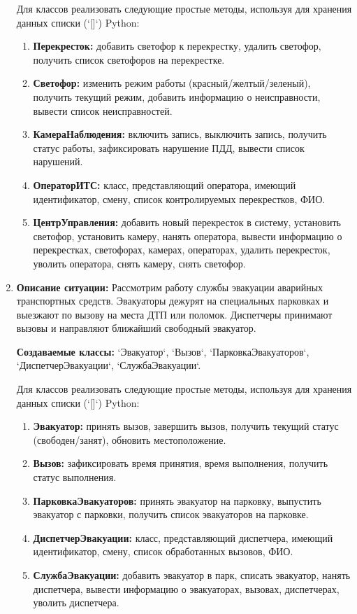 \begin{enumerate}
Для классов реализовать следующие простые методы, используя для хранения данных списки (`[]`) Python:
\begin{enumerate}
    \item \textbf{Перекресток:} добавить светофор к перекрестку, удалить светофор, 
    получить список светофоров на перекрестке.
    \item \textbf{Светофор:} изменить режим работы (красный/желтый/зеленый), 
    получить текущий режим, добавить информацию о неисправности, вывести список неисправностей.
    \item \textbf{КамераНаблюдения:} включить запись, выключить запись, 
    получить статус работы, зафиксировать нарушение ПДД, вывести список нарушений.
    \item \textbf{ОператорИТС:} класс, представляющий оператора, 
    имеющий идентификатор, смену, список контролируемых перекрестков, ФИО.
    \item \textbf{ЦентрУправления:} добавить новый перекресток в систему, 
    установить светофор, установить камеру, нанять оператора, вывести информацию о перекрестках, 
    светофорах, камерах, операторах, удалить перекресток, уволить оператора, снять камеру, снять светофор.
\end{enumerate}

\item \textbf{Описание ситуации:} Рассмотрим работу службы эвакуации аварийных транспортных средств. 
Эвакуаторы дежурят на специальных парковках и выезжают по вызову на места ДТП 
или поломок. Диспетчеры принимают вызовы и направляют ближайший свободный эвакуатор.

\textbf{Создаваемые классы:} `Эвакуатор`, `Вызов`, `ПарковкаЭвакуаторов`, `ДиспетчерЭвакуации`, `СлужбаЭвакуации`.

Для классов реализовать следующие простые методы, используя для хранения данных списки (`[]`) Python:
\begin{enumerate}
    \item \textbf{Эвакуатор:} принять вызов, завершить вызов, 
    получить текущий статус (свободен/занят), обновить местоположение.
    \item \textbf{Вызов:} зафиксировать время принятия, время выполнения, 
    получить статус выполнения.
    \item \textbf{ПарковкаЭвакуаторов:} принять эвакуатор на парковку, 
    выпустить эвакуатор с парковки, 
    получить список эвакуаторов на парковке.
    \item \textbf{ДиспетчерЭвакуации:} класс, представляющий диспетчера, 
    имеющий идентификатор, смену, список обработанных вызовов, ФИО.
    \item \textbf{СлужбаЭвакуации:} добавить эвакуатор в парк, 
    списать эвакуатор, 
    нанять диспетчера, вывести информацию о эвакуаторах, вызовах, диспетчерах, уволить диспетчера.
\end{enumerate}


\end{enumerate}
